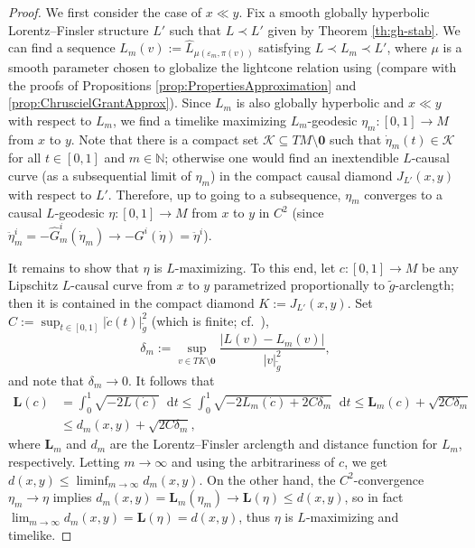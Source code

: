 \documentclass[a4paper,11pt]{article}
\numberwithin{equation}{section}
\theoremstyle{definition}
\theoremstyle{plain}
\newcommand{\N}{\mathbb N}
\newcommand{\eps}{\varepsilon}
\newcommand*\diff{\mathop{}\!\mathrm{d}}
\begin{document}
\begin{proof}
    We first consider the case of $x \ll y$. 
    Fix a smooth globally hyperbolic Lorentz--Finsler structure $L'$ such that $L \prec L'$ given by Theorem \ref{th:gh-stab}.
    We can find a sequence $L_m(v):=\widehat L_{\mu(\eps_m, \pi(v))}$ satisfying $L \prec L_m\prec L'$, where $\mu$ is a smooth parameter chosen to globalize the lightcone relation using \cite[Lem.\ 4.3]{HoermannKunzingerSteinbauer-WaveEq} (compare with the proofs of Propositions \ref{prop:PropertiesApproximation} and \ref{prop:ChruscielGrantApprox}).
    Since $L_m$ is also globally hyperbolic and $x \ll y$ with respect to $L_m$, we find a timelike maximizing $L_m$-geodesic $\eta_m:[0,1] \to M$ from $x$ to $y$. 
    Note that there is a compact set $\mathcal K \subseteq TM \setminus \mathbf{0}$ such that $\dot \eta_m(t) \in \mathcal{K}$ for all $t \in [0,1]$ and $m \in \N$; otherwise one would find an inextendible $L$-causal curve (as a subsequential limit of $\eta_m$) in the compact causal diamond $J_{L'}(x,y)$ with respect to $L'$. 
    Therefore, up to going to a subsequence, $\eta_m$ converges to a causal $L$-geodesic $\eta:[0,1] \to M$ from $x$ to $y$ in $C^2$ (since $\ddot{\eta}^i_m =-\widehat{G}^i_m(\dot{\eta}_m) \to -G^i(\dot{\eta})=\ddot{\eta}^i$). 

    It remains to show that $\eta$ is $L$-maximizing. 
    To this end, let $c:[0,1] \to M$ be any Lipschitz $L$-causal curve from $x$ to $y$ parametrized proportionally to $\tilde g$-arclength; then it is contained in the compact diamond $K:=J_{L'}(x,y)$. 
    Set $C:=\sup_{t \in [0,1]} |\dot{c}(t)|^2_{\tilde g}$ (which is finite; cf.\ \cite[Lemma 2.7]{Saemann}),
    \begin{equation*}
        \delta_m:=\sup_{v \in TK \setminus \mathbf 0} \frac{|L(v) -  L_m(v)|}{|v|^2_{\tilde g}},
    \end{equation*}
    and note that $\delta_m \to 0$. 
    It follows that
    \begin{align*}
        \mathbf L(c) &= \int_0^1 \sqrt{-2L(\dot c)} \diff t
        \leq \int_0^1 \sqrt{-2 L_m(\dot c) + 2 C \delta_m} \diff t
        \leq \mathbf L_m(c) +      \sqrt{2C\delta_m} \\ 
        &\leq d_m(x,y) + \sqrt{2C\delta_m},
    \end{align*}
    where $\mathbf L_m$ and $d_m$ are the Lorentz--Finsler arclength and distance function for $L_m$, respectively. 
    Letting $m \to \infty$ and using the arbitrariness of $c$, we get $d(x,y) \leq \liminf_{m \to \infty} d_m(x,y)$. 
    On the other hand, the $C^2$-convergence $\eta_m \to \eta$ implies $d_m(x,y) = \mathbf L_m(\eta_m) \to \mathbf L(\eta) \leq d(x,y)$, so in fact $\lim_{m \to \infty} d_m(x,y) = \mathbf{L}(\eta) =d(x,y)$, thus $\eta$ is $L$-maximizing and timelike.


\end{proof}
\end{document}

